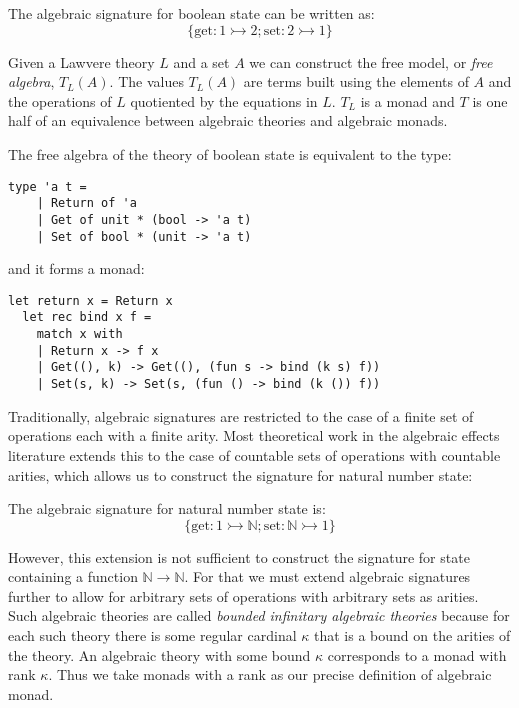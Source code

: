 \documentclass[acmsmall, screen, nonacm]{acmart}
\theoremstyle{definition}
\newcommand{\nat}{\mathbb{N}}
\newcommand{\types}{\mathrel{:}}
\begin{document}
\begin{example}
  The algebraic signature for boolean state can be written as:
  \begin{equation*}
    \{ \mathrm{get} \types 1 \rightarrowtail 2; \mathrm{set} \types 2 \rightarrowtail 1 \}
  \end{equation*}
\end{example}

Given a Lawvere theory $L$ and a set $A$ we can construct the free
model, or \emph{free algebra}, $T_L(A)$. The values $T_L(A)$ are terms
built using the elements of $A$ and the operations of $L$ quotiented by
the equations in $L$. $T_L$ is a monad and $T$ is one half of an
equivalence between algebraic theories and algebraic monads.

\begin{example}
  The free algebra of the theory of boolean state is equivalent
  to the type:
  \begin{lstlisting}[style=oxcaml]
  type 'a t =
    | Return of 'a
    | Get of unit * (bool -> 'a t)
    | Set of bool * (unit -> 'a t)
  \end{lstlisting}
  and it forms a monad:
  \begin{lstlisting}[style=oxcaml]
  let return x = Return x
  let rec bind x f =
    match x with
    | Return x -> f x
    | Get((), k) -> Get((), (fun s -> bind (k s) f))
    | Set(s, k) -> Set(s, (fun () -> bind (k ()) f))
  \end{lstlisting}  
\end{example}

Traditionally, algebraic signatures are restricted to the case of a
finite set of operations each with a finite arity. Most theoretical work
in the algebraic effects literature extends this to the case of
countable sets of operations with countable arities, which allows us to
construct the signature for natural number state:

\begin{example}
  The algebraic signature for natural number state is:
  \begin{equation*}
    \{ \mathrm{get} \types 1 \rightarrowtail \nat;
       \mathrm{set} \types \nat \rightarrowtail 1 \}
  \end{equation*}
\end{example}

However, this extension is not sufficient to construct the signature for
state containing a function $\nat \rightarrow \nat$. For that we must
extend algebraic signatures further to allow for arbitrary sets of
operations with arbitrary sets as arities. Such algebraic theories are
called \emph{bounded infinitary algebraic theories} because for each
such theory there is some regular cardinal $\kappa$ that is a bound on
the arities of the theory. An algebraic theory with some bound $\kappa$
corresponds to a monad with rank $\kappa$. Thus we take monads with a
rank as our precise definition of algebraic monad.
\end{document}
